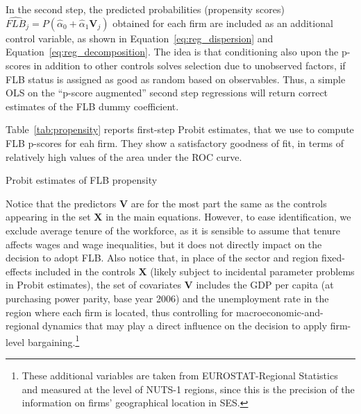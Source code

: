 \documentclass[12pt]{article}
\begin{document}
In the second step, the predicted probabilities (propensity scores)
$\widehat{\mathit{FLB}}_j = \mathit{P}\left( \hat{\alpha}_0 +
  \hat{\alpha}_1\bm{V}_j \right)$ obtained for each firm are included
as an additional control variable, as shown in Equation~\ref{eq:reg_dispersion} and Equation~\ref{eq:reg_decomposition}. The idea is that conditioning also upon the p-scores in addition to other controls solves selection due to unobserved factors, if FLB status is assigned as good as random based on observables. Thus, a simple OLS on the “p-score augmented” second step regressions will return correct estimates of the FLB dummy coefficient.

Table~\ref{tab:propensity} reports first-step Probit estimates, that
we use to compute FLB p-scores for eah firm. They show a satisfactory
goodness of fit, in terms of relatively high values of the area under
the ROC curve.

\begin{table}[thb]
\caption{Probit estimates of FLB propensity}
\label{tab:propensity}

\end{table}

Notice that the predictors $\bm{V}$ are for the most part the same as
the controls appearing in the set $\bm{X}$ in the main equations.
However, to ease identification, we exclude average tenure of the
workforce, as it is sensible to assume that tenure affects wages and
wage inequalities, but it does not directly impact on the decision to
adopt FLB. Also notice that, in place of the sector and region
fixed-effects included in the controls $\bm{X}$ (likely subject to
incidental parameter problems in Probit estimates), the set of
covariates $\bm{V}$ includes the GDP per capita (at
purchasing power parity, base year 2006) and the unemployment rate in
the region where each firm is located, thus controlling for
macroeconomic-and-regional dynamics that may play a direct influence
on the decision to apply firm-level bargaining.\footnote{These
  additional variables are taken from EUROSTAT-Regional Statistics and
  measured at the level of NUTS-1 regions, since this is the
  precision of the information on firms' geographical location in
  SES.}
\end{document}
